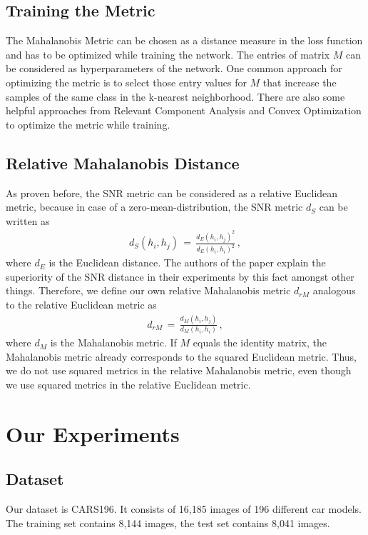 \documentclass[12pt,paper=a4]{scrartcl}
\theoremstyle{break}
\begin{document}
\subsection{Training the Metric}
The Mahalanobis Metric can be chosen as a distance measure in the loss function and has to be optimized while training the network. The entries of matrix $M$ can be considered as hyperparameters of the network. One common approach for optimizing the metric is to select those entry values for $M$ that increase the samples of the same class in the k-nearest neighborhood. There are also some helpful approaches from Relevant Component Analysis and Convex Optimization to optimize the metric while training.
\subsection{Relative Mahalanobis Distance}
As proven before, the SNR metric can be considered as a relative Euclidean metric, because in case of a zero-mean-distribution, the SNR metric $d_S$ can be written as
\begin{align}
d_S(h_i, h_j)\, =\,\frac{d_E(h_i,h_j)^2}{d_E(h_i, h_i)^2}\, ,
\end{align}
where $d_E$ is the Euclidean distance. The authors of the paper explain the superiority of the SNR distance in their experiments by this fact amongst other things. Therefore, we define our own relative Mahalanobis metric $d_{rM}$ analogous to the relative Euclidean metric as
\begin{align}
d_{rM}\, =\, \frac{d_M(h_i,h_j)}{d_M(h_i,h_i)}\, ,
\end{align}
where $d_M$ is the Mahalanobis metric. If $M$ equals the identity matrix, the Mahalanobis metric already corresponds to the squared Euclidean metric. Thus, we do not use squared metrics in the relative Mahalanobis metric, even though we use squared metrics in the relative Euclidean metric.
\section{Our Experiments}
\subsection{Dataset}
Our dataset is CARS196. It consists of 16,185 images of 196 different car models. The training set contains 8,144 images, the test set contains 8,041 images.
\end{document}
